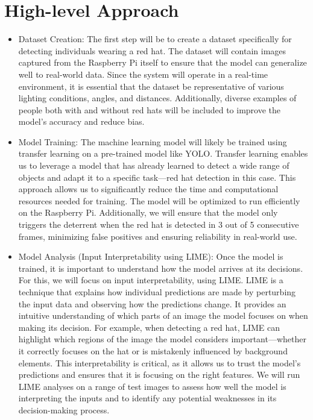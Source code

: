 \documentclass{article}
\begin{document}
\section{High-level Approach}
\begin{itemize}
    \item Dataset Creation: The first step will be to create a dataset specifically for detecting individuals wearing a red hat. The dataset will contain images captured from the Raspberry Pi itself to ensure that the model can generalize well to real-world data. Since the system will operate in a real-time environment, it is essential that the dataset be representative of various lighting conditions, angles, and distances. Additionally, diverse examples of people both with and without red hats will be included to improve the model’s accuracy and reduce bias.
    \item Model Training: The machine learning model will likely be trained using transfer learning on a pre-trained model like YOLO. Transfer learning enables us to leverage a model that has already learned to detect a wide range of objects and adapt it to a specific task—red hat detection in this case. This approach allows us to significantly reduce the time and computational resources needed for training. The model will be optimized to run efficiently on the Raspberry Pi. Additionally, we will ensure that the model only triggers the deterrent when the red hat is detected in 3 out of 5 consecutive frames, minimizing false positives and ensuring reliability in real-world use.
    \item Model Analysis (Input Interpretability using LIME): Once the model is trained, it is important to understand how the model arrives at its decisions. For this, we will focus on input interpretability, using LIME. LIME is a technique that explains how individual predictions are made by perturbing the input data and observing how the predictions change. It provides an intuitive understanding of which parts of an image the model focuses on when making its decision. For example, when detecting a red hat, LIME can highlight which regions of the image the model considers important—whether it correctly focuses on the hat or is mistakenly influenced by background elements. This interpretability is critical, as it allows us to trust the model's predictions and ensures that it is focusing on the right features. We will run LIME analyses on a range of test images to assess how well the model is interpreting the inputs and to identify any potential weaknesses in its decision-making process.

\end{itemize}
\end{document}
